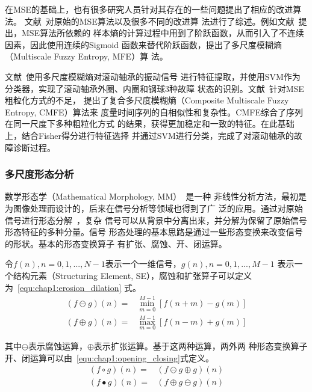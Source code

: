 在MSE的基础上，也有很多研究人员针对其存在的一些问题提出了相应的改进算法。
文献~对原始的MSE算法以及很多不同的改进算
法进行了综述。例如文献~提出，MSE算法所依赖的
样本熵的计算过程中用到了阶跃函数，从而引入了不连续因素，因此使用连续的Sigmoid
函数来替代阶跃函数，提出了多尺度模糊熵（Multiscale Fuzzy Entropy, MFE）算
法。

文献~使用多尺度模糊熵对滚动轴承的振动信号
进行特征提取，并使用SVM作为分类器，实现了滚动轴承外圈、内圈和钢球3种故障
状态的识别。文献~针对MSE粗粒化方式的不足，
提出了复合多尺度模糊熵（Composite Multiscale Fuzzy Entropy, CMFE）算法来
度量时间序列的自相似性和复杂性。CMFE综合了序列在同一尺度下多种粗粒化方式
的结果，获得更加稳定和一致的特征。在此基础上，结合Fisher得分进行特征选择
并通过SVM进行分类，完成了对滚动轴承的故障诊断过程。

\subsubsection{多尺度形态分析}

数学形态学（Mathematical Morphology, MM）~\cite{haralick1987image}是一种
非线性分析方法，最初是为图像处理而设计的，后来在信号分析等领域也得到了广
泛的应用。通过对原始信号进行形态分解~\cite{pitas1990morphological}，复杂
信号可以从背景中分离出来，并分解为保留了原始信号形态特征的多种分量。信号
形态处理的基本思路是通过一些形态变换来改变信号的形状。基本的形态变换算子
有扩张、腐蚀、开、闭运算。

令$f(n), n={0, 1, ..., N-1}$表示一个一维信号，$g(n), n={0, 1, ..., M-1}$
表示一个结构元素（Structuring Element, SE），腐蚀和扩张算子可以定义为~\ref{equ:chap1:erosion_dilation}
式。
\begin{equation}
  \label{equ:chap1:erosion_dilation}
  \begin{aligned}
    (f\ominus g)(n) = & \min_{m=0}^{M-1}\left[f(n+m)-g(m)\right] \\
    (f\oplus g)(n) = & \max_{m=0}^{M-1}\left[f(n-m)+g(m)\right]
  \end{aligned}
\end{equation}

其中$\ominus$表示腐蚀运算，$\oplus$表示扩张运算。基于这两种运算，两外两
种形态变换算子开、闭运算可以由~\ref{equ:chap1:opening_closing}式定义。
\begin{equation}
  \label{equ:chap1:opening_closing}
  \begin{aligned}
    (f\circ g)(n) = & (f\ominus g\oplus g)(n) \\
    (f\bullet g)(n) = & (f\oplus g\ominus g)(n)
  \end{aligned}
\end{equation}

